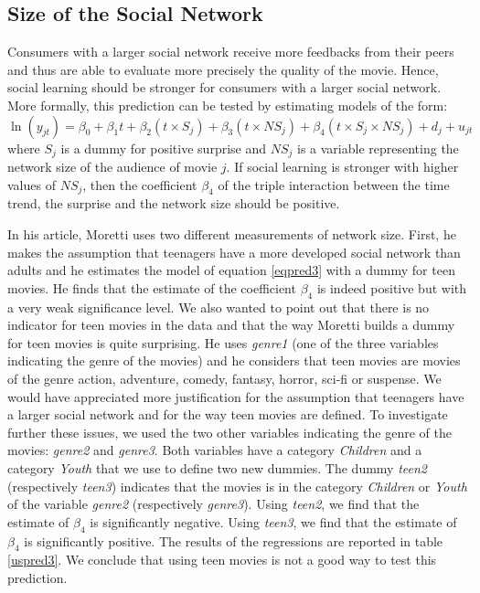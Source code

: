 \subsection{Size of the Social Network}\label{subsec2.4}

Consumers with a larger social network receive more feedbacks from their peers and thus are able to evaluate more precisely the quality of the movie.
Hence, social learning should be stronger for consumers with a larger social network.
More formally, this prediction can be tested by estimating models of the form:
\begin{equation}
	\ln (y_{jt})  = \beta_0 + \beta_1 t + \beta_2 (t \times S_j) + \beta_3 (t \times NS_j) + \beta_4 (t \times S_j \times NS_j) + d_j + u_{jt}
	\label{eqpred3}
\end{equation}
where $S_j$ is a dummy for positive surprise and $NS_j$ is a variable representing the network size of the audience of movie $j$.
If social learning is stronger with higher values of $NS_j$, then the coefficient $\beta_4$ of the triple interaction between the time trend, the surprise and the network size should be positive.

In his article, Moretti uses two different measurements of network size.
First, he makes the assumption that teenagers have a more developed social network than adults and he estimates the model of equation \ref{eqpred3} with a dummy for teen movies.
He finds that the estimate of the coefficient $\beta_4$ is indeed positive but with a very weak significance level.
We also wanted to point out that there is no indicator for teen movies in the data and that the way Moretti builds a dummy for teen movies is quite surprising.
He uses \textit{genre1} (one of the three variables indicating the genre of the movies) and he considers that teen movies are movies of the genre action, adventure, comedy, fantasy, horror, sci-fi or suspense.
We would have appreciated more justification for the assumption that teenagers have a larger social network and for the way teen movies are defined.
To investigate further these issues, we used the two other variables indicating the genre of the movies: \textit{genre2} and \textit{genre3}.
Both variables have a category \textit{Children} and a category \textit{Youth} that we use to define two new dummies.
The dummy \textit{teen2} (respectively \textit{teen3}) indicates that the movies is in the category \textit{Children} or \textit{Youth} of the variable \textit{genre2} (respectively \textit{genre3}).
Using \textit{teen2}, we find that the estimate of $\beta_4$ is significantly negative.
Using \textit{teen3}, we find that the estimate of $\beta_4$ is significantly positive.
The results of the regressions are reported in table \ref{uspred3}.
We conclude that using teen movies is not a good way to test this prediction.

